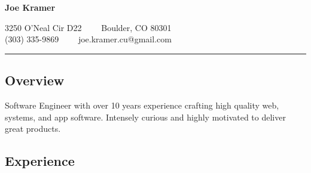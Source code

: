 \documentclass[11pt,letterpaper]{article}
\begin{document}
\begin{center}
{\LARGE \textbf{Joe Kramer}}

\vspace{0.8em}

3250 O'Neal Cir D22\ \ \textbullet
\ \ Boulder, CO 80301
\\
(303) 335-9869\ \ \textbullet
\ \ joe.kramer.cu@gmail.com
\end{center}

\hrule
\vspace{-0.4em}
\subsection*{Overview}
Software Engineer with over 10 years experience crafting high quality web, systems, and app software. Intensely curious and highly motivated to deliver great products.

\subsection*{Experience}
\end{document}
